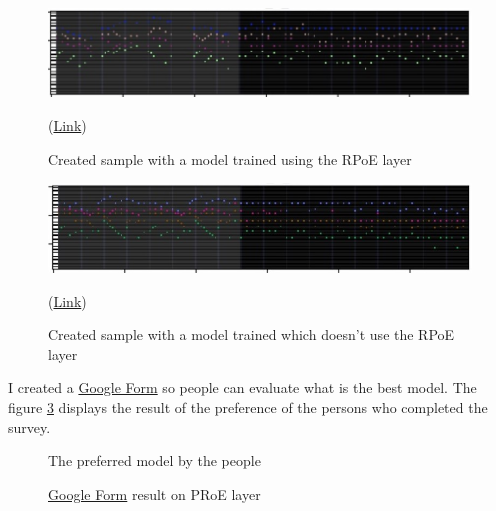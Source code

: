 \documentclass[12pt]{report}
\begin{document}
\begin{figure}[htbp]
    \centering
    \includegraphics[width=\textwidth]{images/experiences/rpoe-rnn/generated-with-rpoe.jpg}
    \caption{Created sample with a model trained using the RPoE layer}
    (\href{https://github.com/ValentinVignal/midiGenerator/blob/master/samples/rpoe-comparison/generated-with-rpoe.mid}{Link})
    \label{fig:exp:rpoe:with}
\end{figure}
\begin{figure}[htbp]
    \centering
    \includegraphics[width=\textwidth]{images/experiences/rpoe-rnn/generated-without-rpoe.jpg}
    \caption{Created sample with a model trained which doesn't use the RPoE layer}
    (\href{https://github.com/ValentinVignal/midiGenerator/blob/master/samples/rpoe-comparison/generated-without-rpoe.mid}{Link})
    \label{fig:exp:rpoe:without}
\end{figure}

I created a \href{https://docs.google.com/forms/d/e/1FAIpQLSf1tkCLj78u-IoMYjGWa3iTYWIT_gbPnGIShjFox4whfhkjLw/viewform?usp=sf_link}{Google Form} so people can evaluate what is the best model.
The figure \ref{fig:pie:rpoe} displays the result of the preference of the persons who completed the survey.


\begin{figure}
    \begin{center}
    \caption{\href{https://docs.google.com/forms/d/e/1FAIpQLSf1tkCLj78u-IoMYjGWa3iTYWIT_gbPnGIShjFox4whfhkjLw/viewform?usp=sf_link}{Google Form} result on PRoE layer}
    The preferred model by the people
    \label{fig:pie:rpoe}
    \end{center}
\end{figure}
\end{document}

